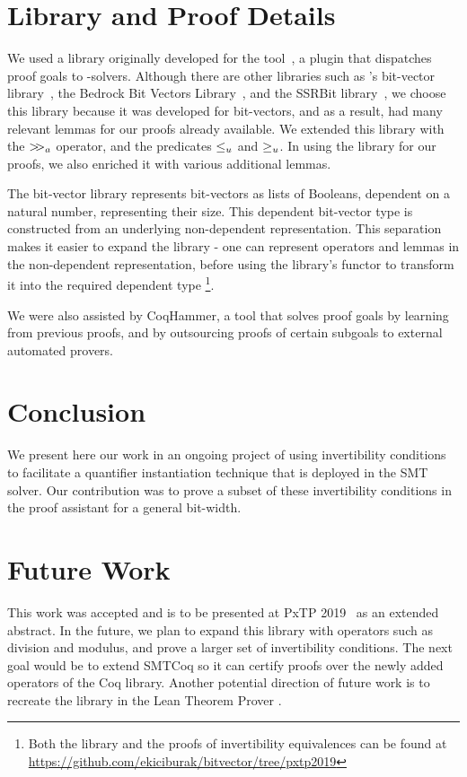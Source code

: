 \documentclass[10pt,conference]{IEEEtran}
\begin{document}
\section{Library and Proof Details}
\label{proofs}
We used a library originally developed for the
\smtcoq tool~\cite{DBLP:conf/cav/EkiciMTKKRB17},
a \coq plugin 
that dispatches proof goals to \smt-solvers.
Although there are other libraries such as 
\coq's bit-vector library~\cite{coqbvlib}, 
the Bedrock Bit Vectors Library~\cite{bbvlib}, and the SSRBit library~\cite{ssrbit},
we choose this library because it was developed 
for \smtlib bit-vectors, and as a result, had many 
relevant lemmas for our proofs already available.
We extended this library with the $\mathop{>\kern-.3em>_a}$
operator, and the predicates $\leq_u$ and $\geq_u$.
In using the library for our proofs, we also enriched 
it with various additional lemmas.

The bit-vector library represents bit-vectors as 
lists of Booleans, dependent on a natural number, 
representing their size. This dependent bit-vector 
type is constructed from an underlying non-dependent 
representation. This separation makes it easier to 
expand the library - one can represent operators 
and lemmas in the non-dependent representation, 
before using the library's functor to transform it 
into the required dependent type
\footnote{Both the library and the proofs of invertibility equivalences can be found at \url{https://github.com/ekiciburak/bitvector/tree/pxtp2019}}.

We were also assisted by CoqHammer, a tool that 
solves proof goals by learning from previous proofs, 
and by outsourcing proofs of certain subgoals 
to external automated provers.
 
\section{Conclusion}
\label{conc}
We present here our work in an ongoing 
project of using invertibility conditions to facilitate a 
quantifier instantiation technique that is deployed in 
the \cvcfour SMT solver. Our contribution was to 
prove a subset of these invertibility conditions in the 
\coq proof assistant for a general bit-width. 

\section{Future Work}
\label{future}
This work was accepted and is to be presented at PxTP 
2019~\cite{b3} as an extended abstract.
In the future, we plan to expand this library 
with operators such as division and 
modulus, and prove a larger set of 
invertibility conditions. The next goal would be 
to extend SMTCoq so it can certify proofs 
over the newly added operators of the Coq library. 
Another potential 
direction of future work is to recreate the library 
in the Lean Theorem Prover \cite{conf/cade/MouraKADR15}.
\end{document}
